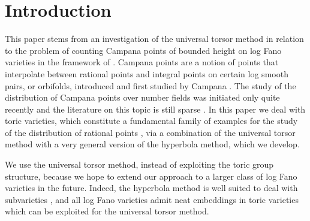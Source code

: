\Changel

\section{Introduction}

This paper stems from an investigation of the universal torsor method \cite{MR1679841, MR3552013} in relation to the problem of counting Campana points of bounded height on log Fano varieties in the framework of \cite[Conj.\,1.1]{PSTVA}.
Campana points are a notion of points that interpolate between rational points and integral points on certain log smooth pairs, or orbifolds, introduced and first studied by Campana \cite{MR2097416, MR2831280, MR3477539}. The study of the distribution of Campana points over number fields was initiated only quite recently and the literature on this topic is still sparse \cite{MR2931315, MR2968632, BY, Shute2, PSTVA, Shute, Streeter, Xiao, BBKOPWproc}.
In this paper we deal with toric varieties, which constitute a fundamental family of examples for the study of the distribution of rational points \cite{MR1353919, MR1369408, MR1423638, MR1620682, MR1679841, Bre01b}, via a combination of the universal torsor method with a very general version of the hyperbola method, which we develop.

We use the universal torsor method, instead of exploiting the toric group structure, because we hope to extend our approach to a larger class of log Fano varieties in the future. Indeed,
the hyperbola method is well suited to deal with subvarieties \cite{MR3320489, Sch, MR3731304, BB, mignot1, Mignot, mignot2, BroHu}, and all log Fano varieties admit neat embeddings in toric varieties \cite{MR3307753, MR3275656} which can be exploited for the universal torsor method.\par

